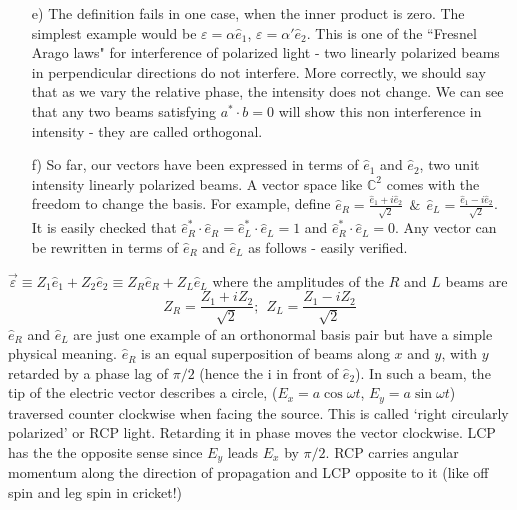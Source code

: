 \begin{itemize}
\item[e)] The definition fails in one case, when the inner product is zero. The simplest
example would be $\varepsilon = \alpha \hat{e}_1$, $\varepsilon = \alpha' \hat{e}_2$. This is one of the ``Fresnel Arago laws" for
interference of polarized light - two linearly polarized beams in perpendicular
directions do not interfere. More correctly, we should say that as we vary the
relative phase, the intensity does not change. We can see that any two beams
satisfying $a^{\ast} \cdot b = 0$ will show this non interference in intensity - they are called
orthogonal.

\item[f)] So far, our vectors have been expressed in terms of $\hat{e}_1$ and $\hat{e}_2$, two unit intensity
linearly polarized beams. A vector space like $\mathbb{C}^2$ comes with the freedom to
change the basis. For example, define $\hat{e}_R = \frac{\hat{e}_1 + i \hat{e}_2}{\sqrt{2}} ~~\&~~ \hat{e}_L = \frac{\hat{e}_1 - i \hat{e}_2}{\sqrt{2}}$. It is easily
checked that $\hat{e}^{\ast}_R  \cdot \hat{e}_R = \hat{e}^{\ast}_L \cdot \hat{e}_L = 1$ and $\hat{e}^{\ast}_R \cdot \hat{e}_L = 0$. Any vector can be rewritten
in terms of $\hat{e}_R$ and $\hat{e}_L$ as follows - easily verified.
\end{itemize}
$\overrightarrow{\varepsilon} \equiv Z_1 \hat{e}_1 + Z_2 \hat{e}_2  \equiv Z_R \hat{e}_R + Z_L \hat{e}_L$ where the amplitudes of the $R$ and $L$ beams are 
$$
Z_R  = \dfrac{Z_1 + iZ_2}{\sqrt{2}} ; ~~ Z_L = \dfrac{Z_1 - iZ_2}{\sqrt{2}}
$$
$\hat{e}_R$ and $\hat{e}_L$ are just one example of an orthonormal basis pair but have a simple
physical meaning. $\hat{e}_R$ is an equal superposition of beams along $x$ and $y$, with
$y$ retarded by a phase lag of $\pi/2$ (hence the i in front of $\hat{e}_2$). In such a beam,
the tip of the electric vector describes a circle, ($E_x = a \cos\omega t$, $E_y = a \sin\omega t$)
traversed counter clockwise when facing the source. This is called `right circularly polarized' or RCP light. Retarding it in phase moves the vector clockwise.
LCP has the the opposite sense since $E_y$ leads $E_x$ by $\pi/2$. RCP carries angular
momentum along the direction of propagation and LCP opposite to it (like off
spin and leg spin in cricket!)
\smallskip

